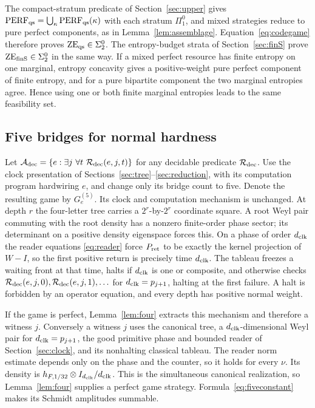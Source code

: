 The compact-stratum predicate of Section~\ref{sec:upper} gives $\mathrm{PERF}_{\mathrm{qs}}=\bigcup_\kappa\mathrm{PERF}_{\mathrm{qs}}(\kappa)$ with each stratum $\Pi^0_1$, and mixed strategies reduce to pure perfect components, as in Lemma~\ref{lem:assemblage}. Equation~\eqref{eq:codegame} therefore proves $\mathrm{ZE}_{\mathrm{qs}}\in\Sigma^0_2$. The entropy-budget strata of Section~\ref{sec:finS} prove $\mathrm{ZE}_{\mathrm{finS}}\in\Sigma^0_2$ in the same way. If a mixed perfect resource has finite entropy on one marginal, entropy concavity gives a positive-weight pure perfect component of finite entropy, and for a pure bipartite component the two marginal entropies agree. Hence using one or both finite marginal entropies leads to the same feasibility set.

\subsection{Five bridges for normal hardness}
Let $\Adec=\{e:\exists j\ \forall t\ \Rdec(e,j,t)\}$ for any decidable predicate $\mathcal R_{\rm dec}$. Use the clock presentation of Sections~\ref{sec:tree}--\ref{sec:reduction}, with its computation program hardwiring $e$, and change only its bridge count to five. Denote the resulting game by $G^{(5)}_e$. Its clock and computation mechanism is unchanged. At depth $r$ the four-letter tree carries a $2^r$-by-$2^r$ coordinate square. A root Weyl pair commuting with the root density has a nonzero finite-order phase sector; its determinant on a positive density eigenspace forces this. On a phase of order ${d_{\rm clk}}$ the reader equations \eqref{eq:reader} force $P_{\rm ret}$ to be exactly the kernel projection of $W-I$, so the first positive return is precisely time ${d_{\rm clk}}$. The tableau freezes a waiting front at that time, halts if ${d_{\rm clk}}$ is one or composite, and otherwise checks $\mathcal R_{\rm dec}(e,j,0),\mathcal R_{\rm dec}(e,j,1),\ldots$ for ${d_{\rm clk}}=p_{j+1}$, halting at the first failure. A halt is forbidden by an operator equation, and every depth has positive normal weight.

If the game is perfect, Lemma~\ref{lem:four} extracts this mechanism and therefore a witness $j$. Conversely a witness $j$ uses the canonical tree, a ${d_{\rm clk}}$-dimensional Weyl pair for ${d_{\rm clk}}=p_{j+1}$, the good primitive phase and bounded reader of Section~\ref{sec:clock}, and its nonhalting classical tableau. The reader norm estimate depends only on the phase and the counter, so it holds for every $\nu$. Its density is $h_{F,1/32}\otimes I_{{d_{\rm clk}}}/{d_{\rm clk}}$. This is the simultaneous canonical realization, so Lemma~\ref{lem:four} supplies a perfect game strategy. Formula~\eqref{eq:fiveconstant} makes its Schmidt amplitudes summable.


